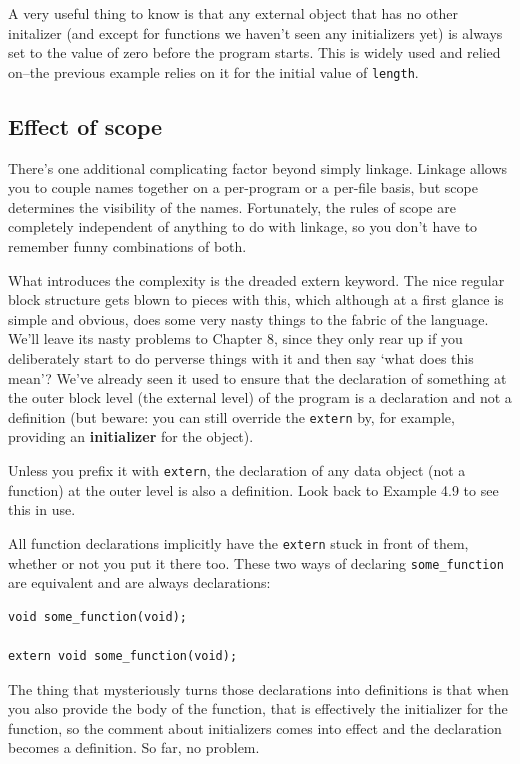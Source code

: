   A very useful thing to know is that any external object that has no
   other initalizer (and except for functions we haven't seen any
   initializers yet) is always set to the value of zero before the program
   starts. This is widely used and relied on--the previous example
   relies on it for the initial value of \texttt{length}.


  \subsection{Effect of scope}
   

   There's one additional complicating factor beyond simply linkage.
    Linkage allows you to couple names together on a per-program or a
    per-file basis, but scope determines the visibility of the names.
    Fortunately, the rules of scope are completely independent of anything
    to do with linkage, so you don't have to remember funny combinations of
    both.


   What introduces the complexity is the dreaded extern keyword. The nice
    regular block structure gets blown to pieces with this, which although
    at a first glance is simple and obvious, does some very nasty things to
    the fabric of the language. We'll leave its nasty problems to
    Chapter 8, since they only rear up if you deliberately
    start to do perverse things with it and then say `what does this
    mean'? We've already seen it used to ensure that the declaration of
    something at the outer block level (the external level) of the program
    is a declaration and not a definition (but beware: you can still
    override the \texttt{extern} by, for example, providing an
    \textbf{initializer} for the object).


   Unless you prefix it with \texttt{extern}, the declaration of any
    data object (not a function) at the outer level is also a definition.
    Look back to Example 4.9 to see this in use.


   All function declarations implicitly have the \texttt{extern}
    stuck in front of them, whether or not you put it there too. These two
    ways of declaring \texttt{some\_function} are equivalent and are
    always declarations:

\begin{Verbatim}
void some_function(void);

extern void some_function(void);
\end{Verbatim}

   The thing that mysteriously turns those declarations into definitions
    is that when you also provide the body of the function, that is
    effectively the initializer for the function, so the comment about
    initializers comes into effect and the declaration becomes a definition.
    So far, no problem.


